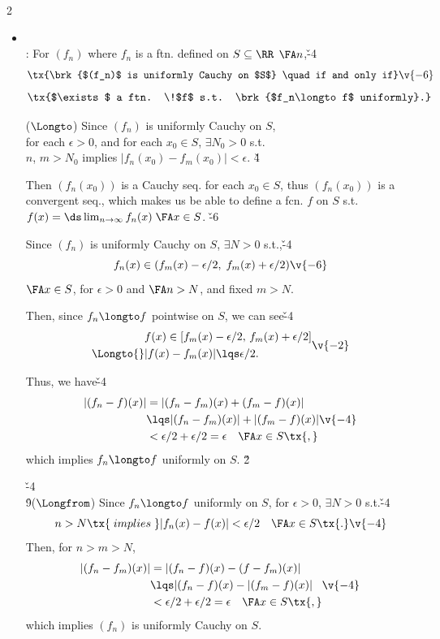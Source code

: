 \documentclass[dvipdfmx,a4paper,titlepage,9pt]{jsarticle}
\begin{document}
\begin{multicols*}{2}
\begin{itemize}[label={-}]
\item{} \\
: For $(f_n)$ where $f_n$ is a ftn. \!defined on $S\subseteq\RR$ \;$\FA n$,\v{-4}
$$\tx{\brk{$(f_n)$ is uniformly Cauchy on $S$} \quad if and only if}\v{-6}$$
$$\tx{$\exists$ a ftn. \!$f$ s.t. \brk{$f_n\longto f$ uniformly}.}$$

\begin{Pfbox}
($\Longto$) Since $(f_n)$ is uniformly Cauchy on $S$, \\
for each $\epsilon>0$, and for each $x_0\in S$, $\exists N_0>0$ s.t. \\
$n$, $m>N_0$ implies $|f_n(x_0)-f_m(x_0)|<\epsilon$. \v4

Then $(f_n(x_0))$ is a Cauchy seq. for each $x_0\in S$, thus $(f_n(x_0))$ is a convergent seq., which makes us be able to define a fcn. $f$ on $S$ s.t. $f(x)=\ds\lim_{n\to\infty}f_n(x)\;\FA x\in S$. \v{-6}

Since $(f_n)$ is uniformly Cauchy on $S$, $\exists N>0$ s.t.,\v{-4}
$$f_n(x)\in(f_m(x)-\epsilon/2,\;f_m(x)+\epsilon/2)\v{-6}$$
$\FA x\in S$, for $\epsilon>0$ and $\FA n>N$, and fixed $m>N$.

Then, since $f_n\longto f$ pointwise on $S$, we can see\v{-4}
$$\begin{aligned}
           & f(x)\in[f_m(x)-\epsilon/2,\,f_m(x)+\epsilon/2] \\
  \Longto{}& |f(x)-f_m(x)|\lqs\epsilon/2.
  \end{aligned}\v{-2}$$
  
Thus, we have\v{-4}
$$\begin{aligned}
  |(f_n-f)(x)|&   =|(f_n-f_m)(x)+(f_m-f)(x)| \\
              &\lqs|(f_n-f_m)(x)|+|(f_m-f)(x)| \\
              &   <\epsilon/2+\epsilon/2=\epsilon\quad\FA x\in S\tx{,}
  \end{aligned}\v{-4}$$
which implies $f_n\longto f$ uniformly on $S$. \hfill \Sq \v2

\dotfill \v{-4}\\

\h9($\Longfrom$) Since $f_n\longto f$ uniformly on $S$, for $\epsilon>0$, $\exists N>0$ s.t.\v{-4}
$$n>N\tx{\;implies\;}|f_n(x)-f(x)|<\epsilon/2\quad\FA x\in S\tx{.}\v{-4}$$
Then, for $n>m>N$,
$$\begin{aligned}
  |(f_n-f_m)(x)|&   =|(f_n-f)(x)-(f-f_m)(x)| \\
                &\lqs|(f_n-f)(x)-|(f_m-f)(x)| \\
                &   <\epsilon/2+\epsilon/2=\epsilon\quad\FA x\in S\tx{,}
  \end{aligned}\v{-4}$$
which implies $(f_n)$ is uniformly Cauchy on $S$.
\end{Pfbox}
\end{itemize}


\end{multicols*}
\end{document}
